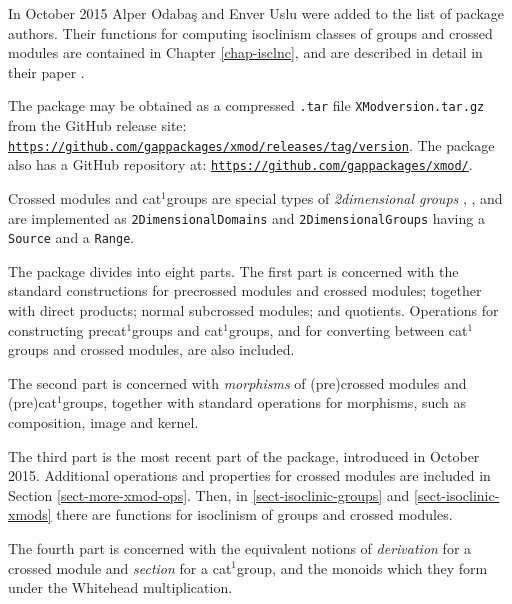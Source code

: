 \documentclass[a4paper,11pt]{report}
\begin{document}
{ In October 2015 Alper Odaba{\c s} and Enver Uslu were added to the list of
package authors. Their functions for computing isoclinism classes of groups
and crossed modules are contained in Chapter \ref{chap-isclnc}, and are described in detail in their paper \cite{IOU1}. 

 The package may be obtained as a compressed \texttt{.tar} file \texttt{XMod\texttt{}version.tar.gz} from the GitHub release site: \href{https://github.com/gap-packages/xmod/releases/tag/version} {\texttt{https://github.com/gap\texttt{}packages/xmod/releases/tag/version}}.  The package also has a GitHub repository at: \href{https://github.com/gap-packages/xmod/} {\texttt{https://github.com/gap\texttt{}packages/xmod/}}. 

 Crossed modules and cat$^1$\texttt{}groups are special types of \emph{2\texttt{}dimensional groups} \cite{B82}, \cite{brow:hig:siv}, and are implemented as \texttt{2DimensionalDomains} and \texttt{2DimensionalGroups} having a \texttt{Source} and a \texttt{Range}.   

 The package divides into eight parts. The first part is concerned with the
standard constructions for pre\texttt{}crossed modules and crossed
modules; together with direct products; normal sub\texttt{}crossed
modules; and quotients. Operations for constructing pre\texttt{}cat$^1$\texttt{}groups and cat$^1$\texttt{}groups, and for converting between cat$^1$\texttt{}groups and crossed modules, are also included. 

 The second part is concerned with \emph{morphisms} of (pre\texttt{})crossed modules and (pre\texttt{})cat$^1$\texttt{}groups, together with standard operations for morphisms,
such as composition, image and kernel. 

 The third part is the most recent part of the package, introduced in October
2015. Additional operations and properties for crossed modules are included in
Section \ref{sect-more-xmod-ops}. Then, in \ref{sect-isoclinic-groups} and \ref{sect-isoclinic-xmods} there are functions for isoclinism of groups and crossed modules. 

 The fourth part is concerned with the equivalent notions of \emph{derivation} for a crossed module and \emph{section} for a cat$^1$\texttt{}group, and the monoids which they form under the Whitehead
multiplication. 

}
\end{document}

